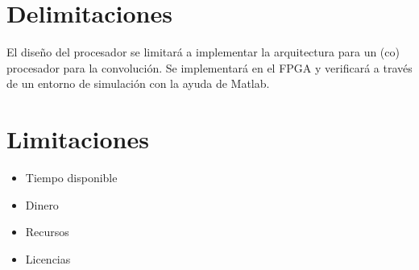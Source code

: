 \section{Delimitaciones}
El diseño del procesador se limitará a implementar la arquitectura para un (co) procesador para la convolución. Se implementará en el FPGA y verificará a través de un entorno de simulación con la ayuda de Matlab.  

\section{Limitaciones}
\begin{itemize}
Las principales limitaciones del proyecto son: 
\item Tiempo disponible
\item Dinero
\item Recursos
\item Licencias
\end{itemize}
